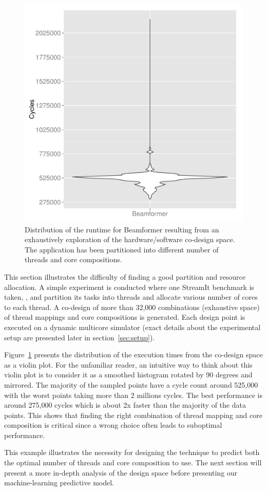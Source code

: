 \begin{figure}[t]
    \centering
    \includegraphics[width=1\textwidth]{streamit-paper/graphics/beamformer_motivation.pdf}
    \caption{Distribution of the runtime for Beamformer resulting from an exhaustively exploration of the hardware/software co-design space.
     The application has been partitioned into different number of threads and core compositions.}
     \label{fig:beamformermotiv}
\end{figure}

This section illustrates the difficulty of finding a good partition and resource allocation.
A simple experiment is conducted where one StreamIt benchmark is taken, , and partition its tasks into threads and allocate various number of cores to each thread.
A co-design of more than 32,000 combinations (exhaustive space) of thread mappings and core compositions is generated.
Each design point is executed on a dynamic multicore simulator (exact details about the experimental setup are presented later in section~\ref{sec:setup}).

Figure~\ref{fig:beamformermotiv} presents the distribution of the execution times from the co-design space as a violin plot.
For the unfamiliar reader, an intuitive way to think about this violin plot is to consider it as a smoothed histogram rotated by 90 degrees and mirrored.
The majority of the sampled points have a cycle count around 525,000 with the worst points taking more than 2 millions cycles.
The best performance is around 275,000 cycles which is about 2x faster than the majority of the data points.
This shows that finding the right combination of thread mapping and core composition is critical since a wrong choice often leads to suboptimal performance.

This example illustrates the necessity for designing the technique to predict both the optimal number of threads and core composition to use.
The next section will present a more in-depth analysis of the design space before presenting our machine-learning predictive model.

